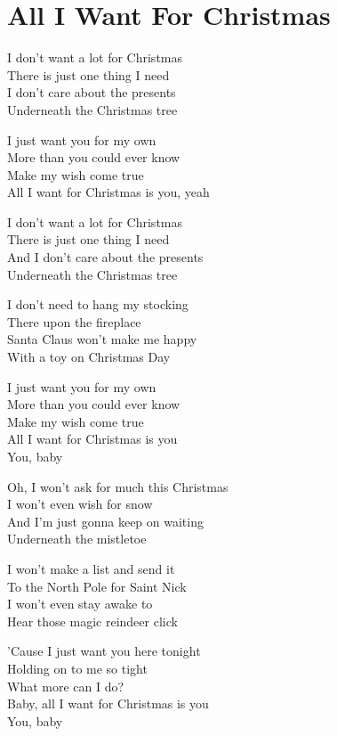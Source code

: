 \section{All I Want For Christmas}
I don't want a lot for Christmas\\
There is just one thing I need\\
I don't care about the presents\\
Underneath the Christmas tree

I just want you for my own\\
More than you could ever know\\
Make my wish come true\\
All I want for Christmas is you, yeah

I don't want a lot for Christmas\\
There is just one thing I need\\
And I don't care about the presents\\
Underneath the Christmas tree

I don't need to hang my stocking\\
There upon the fireplace\\
Santa Claus won't make me happy\\
With a toy on Christmas Day

I just want you for my own\\
More than you could ever know\\
Make my wish come true\\
All I want for Christmas is you\\
You, baby

Oh, I won't ask for much this Christmas\\
I won't even wish for snow\\
And I'm just gonna keep on waiting\\
Underneath the mistletoe

I won't make a list and send it\\
To the North Pole for Saint Nick\\
I won't even stay awake to\\
Hear those magic reindeer click

'Cause I just want you here tonight\\
Holding on to me so tight\\
What more can I do?\\
Baby, all I want for Christmas is you\\
You, baby

